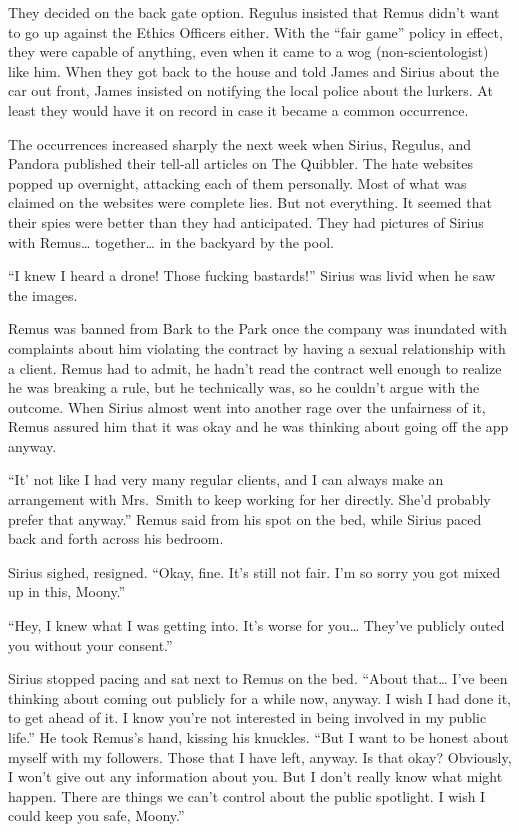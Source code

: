 \documentclass[12pt,twoside,openright]{memoir}
\begin{document}
They decided on the back gate option. Regulus insisted that Remus didn't want to go up against the Ethics Officers either. With the ``fair game'' policy in effect, they were capable of anything, even when it came to a wog
(non-scientologist) like him. When they got back to the house and told James and Sirius about the car out front, James insisted on notifying the local police about the lurkers. At least they would have it on record in case it became a common occurrence.

The occurrences increased sharply the next week when Sirius, Regulus, and Pandora published their tell-all articles on The Quibbler. The hate websites popped up overnight, attacking each of them personally. Most of what was claimed on the websites were complete lies. But not everything. It seemed that their spies were better than they had anticipated. They had pictures of Sirius with Remus… together… in the backyard by the pool. 

``I knew I heard a drone! Those fucking bastards!'' Sirius was livid when he saw the images. 

Remus was banned from Bark to the Park once the company was inundated with complaints about him violating the contract by having a sexual relationship with a client. Remus had to admit, he hadn't read the contract well enough to realize he was breaking a rule, but he technically was, so he couldn't argue with the outcome. When Sirius almost went into another rage over the unfairness of it, Remus assured him that it was okay and he was thinking about going off the app anyway. 

``It' not like I had very many regular clients, and I can always make an arrangement with Mrs.\ Smith to keep working for her directly. She'd probably prefer that anyway.'' Remus said from his spot on the bed, while Sirius paced back and forth across his bedroom.

Sirius sighed, resigned. ``Okay, fine. It's still not fair. I'm so sorry you got mixed up in this, Moony.''

``Hey, I knew what I was getting into. It's worse for you… They've publicly outed you without your consent.''

Sirius stopped pacing and sat next to Remus on the bed. ``About that… I've been thinking about coming out publicly for a while now, anyway. I wish I had done it, to get ahead of it. I know you're not interested in being involved in my public life.'' He took Remus's hand, kissing his knuckles. ``But I want to be honest about myself with my followers. Those that I have left, anyway. Is that okay? Obviously, I won't give out any information about you. But I don't really know what might happen. There are things we can't control about the public spotlight. I wish I could keep you safe, Moony.''
\end{document}
